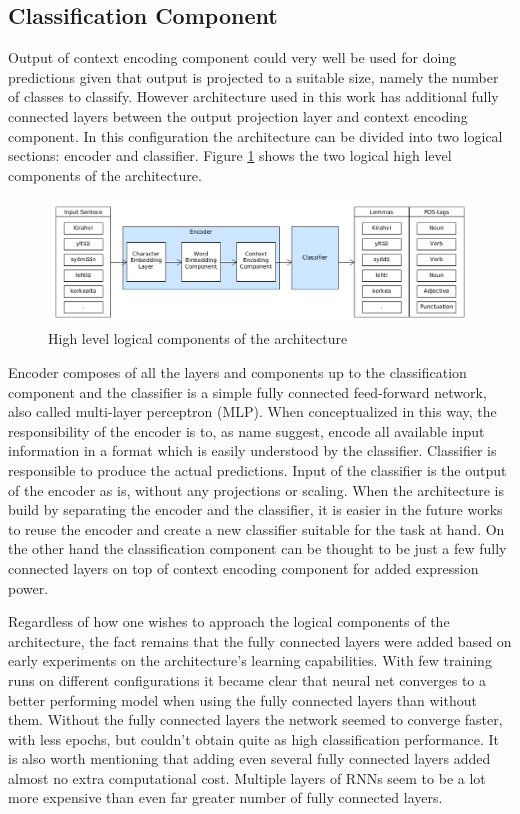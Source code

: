 \documentclass[12pt,a4paper,english
]{tutthesis}
\begin{document}
\subsection{Classification Component}
\label{ss:classification_component}
Output of context encoding component could very well be used for doing predictions given that output is projected to a suitable size, namely the number of classes to classify. However architecture used in this work has additional fully connected layers between the output projection layer and context encoding component. In this configuration the architecture can be divided into two logical sections: encoder and classifier. Figure \ref{figure:encoder_classifier} shows the two logical high level components of the architecture.

\begin{figure}[htbp]
\caption{High level logical components of the architecture}
\label{figure:encoder_classifier}
\centering
\includegraphics[width=15cm]{encoder_classifier.png}
\end{figure}

Encoder composes of all the layers and components up to the classification component and the classifier is a simple fully connected feed-forward network, also called multi-layer perceptron (MLP). When conceptualized in this way, the responsibility of the encoder is to, as name suggest, encode all available input information in a format which is easily understood by the classifier. Classifier is responsible to produce the actual predictions. Input of the classifier is the output of the encoder as is, without any projections or scaling. When the architecture is build by separating the encoder and the classifier, it is easier in the future works to reuse the encoder and create a new classifier suitable for the task at hand. On the other hand the classification component can be thought to be just a few fully connected layers on top of context encoding component for added expression power.

Regardless of how one wishes to approach the logical components of the architecture, the fact remains that the fully connected layers were added based on early experiments on the architecture's learning capabilities. With few training runs on different configurations it became clear that neural net converges to a better performing model when using the fully connected layers than without them. Without the fully connected layers the network seemed to converge faster, with less epochs, but couldn't obtain quite as high classification performance. It is also worth mentioning that adding even several fully connected layers added almost no extra computational cost. Multiple layers of RNNs seem to be a lot more expensive than even far greater number of fully connected layers.
\end{document}
